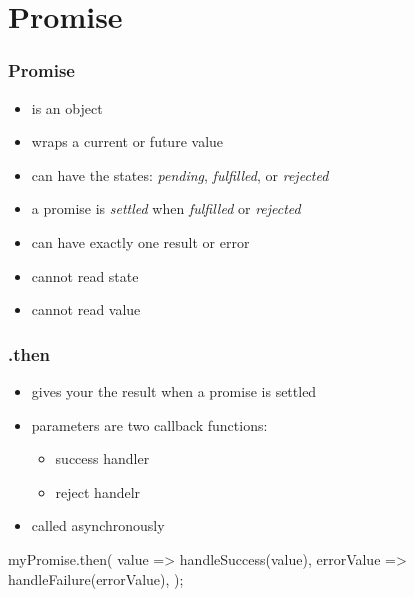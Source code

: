 \section{Promise}
\begin{frame}[fragile] \frametitle{Promise}
\begin{itemize}
  \item is an object
  \item wraps a current or future value
  \item can have the states: \emph{pending}, \emph{fulfilled}, or \emph{rejected}
  \item a promise is \emph{settled} when  \emph{fulfilled} or \emph{rejected}
  \item can have exactly one result or error
  \item cannot read state
  \item cannot read value
\end{itemize}
\end{frame}

\begin{frame}[fragile] \frametitle{.then}
\begin{itemize}
  \item {} gives your the result when a promise is settled
  \item parameters are two callback functions:
  \begin{itemize}
    \item success handler
    \item reject handelr
  \end{itemize}
  \item called asynchronously
\end{itemize}
\vspace{5mm}
\begin{CodeBox}{}
myPromise.then(
  value => handleSuccess(value),
  errorValue => handleFailure(errorValue),
);
\end{CodeBox}
\end{frame}

